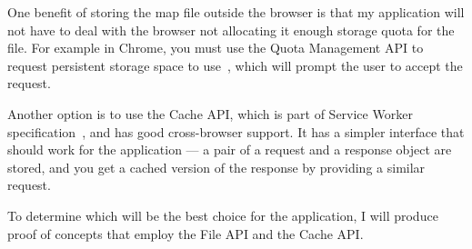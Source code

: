 One benefit of storing the map file outside the browser is that my application will not have to deal with the browser not allocating it enough storage quota for the file. For example in Chrome, you must use the Quota Management API to request persistent storage space to use~\cite{gd-offline-html5-storage}, which will prompt the user to accept the request.

Another option is to use the Cache API, which is part of Service Worker specification~\cite{w3c-service-workers-caches}, and has good cross-browser support. It has a simpler interface that should work for the application --- a pair of a request and a response object are stored, and you get a cached version of the response by providing a similar request. 

To determine which will be the best choice for the application, I will produce proof of concepts that employ the File API and the Cache API\@.
